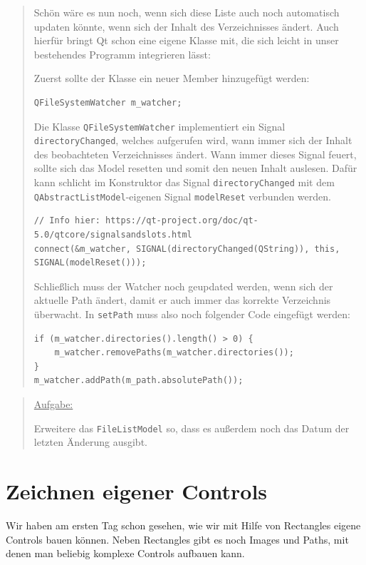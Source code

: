 \documentclass[a4paper]{article}
\begin{document}
\begin{quote}
Schön wäre es nun noch, wenn sich diese Liste auch noch automatisch updaten könnte, wenn sich der Inhalt des Verzeichnisses ändert. Auch hierfür bringt Qt schon eine eigene Klasse mit, die sich leicht in unser bestehendes Programm integrieren lässt:

Zuerst sollte der Klasse ein neuer Member hinzugefügt werden:

\begin{verbatim}
QFileSystemWatcher m_watcher;
\end{verbatim}

Die Klasse \verb~QFileSystemWatcher~ implementiert ein Signal \verb~directoryChanged~, welches aufgerufen wird, wann immer sich der Inhalt des beobachteten Verzeichnisses ändert. Wann immer dieses Signal feuert, sollte sich das Model resetten und somit den neuen Inhalt auslesen. Dafür kann schlicht im Konstruktor das Signal \verb~directoryChanged~ mit dem \verb~QAbstractListModel~-eigenen Signal \verb~modelReset~ verbunden werden.

\begin{verbatim}
// Info hier: https://qt-project.org/doc/qt-5.0/qtcore/signalsandslots.html
connect(&m_watcher, SIGNAL(directoryChanged(QString)), this, SIGNAL(modelReset()));
\end{verbatim}

Schließlich muss der Watcher noch geupdated werden, wenn sich der aktuelle Path ändert, damit er auch immer das korrekte Verzeichnis überwacht. In \verb~setPath~ muss also noch folgender Code eingefügt werden:
\begin{verbatim}
if (m_watcher.directories().length() > 0) {
    m_watcher.removePaths(m_watcher.directories());
}
m_watcher.addPath(m_path.absolutePath());
\end{verbatim}
\end{quote}

\begin{quote}
\uline{Aufgabe:}

Erweitere das \verb~FileListModel~ so, dass es außerdem noch das Datum der letzten Änderung ausgibt.
\end{quote}
\section{Zeichnen eigener Controls}
\label{sec-3}
Wir haben am ersten Tag schon gesehen, wie wir mit Hilfe von Rectangles eigene Controls bauen können. Neben Rectangles gibt es noch Images und Paths, mit denen man beliebig komplexe Controls aufbauen kann.
\end{document}
